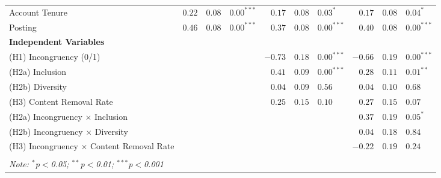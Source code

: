 \begin{table*}[]
\begin{tabular}{lrrlrrlrrl}
    Account Tenure & $0.22$ & $0.08$ & $0.00^{***}$ & $0.17$ & $0.08$ & $0.03^{*}$ & $0.17$ & $0.08$ & $0.04^{*}$\\
    Posting & $0.46$ & $0.08$ & $0.00^{***}$& $0.37$ & $0.08$ & $0.00^{***}$ & $0.40$ & $0.08$ & $0.00^{***}$\\ \addlinespace
    \textbf{Independent Variables} \\
    (H1) Incongruency (0/1) & & & & $-0.73$ & $0.18$ & $0.00^{***}$ & $-0.66$ & $0.19$& $0.00^{***}$\\
    (H2a) Inclusion & & & & $0.41$ & $0.09$ & $0.00^{***}$ & $0.28$ & $0.11$ & $0.01^{**}$\\
    (H2b) Diversity & & & & $0.04$ & $0.09$ & $0.56$ & $0.04$ & $0.10$ & $0.68$\\
    (H3) Content Removal Rate & & & & $0.25$ & $0.15$ & $0.10$ & $0.27$ & $0.15$ &$0.07$\\ \addlinespace
    (H2a) Incongruency $\times$ Inclusion  & & & & & & & $0.37$ & $0.19$ & $0.05^{*}$\\
    (H2b) Incongruency $\times$ Diversity & & & & & & & $0.04$ & $0.18$ & $0.84$\\
    (H3) Incongruency $\times$ Content Removal Rate & & & & & & & $-0.22$ & $0.19$ & $0.24$\\
    [1.2ex]
    \hline \\[-1.8ex] 
    \textit{Note: $^{*}$p$<$0.05; $^{**}$p$<$0.01; $^{***}$p$<$0.001} \\ 
    \bottomrule
    \end{tabular}
    \label{tab:model1_ordinal}
\end{table*}